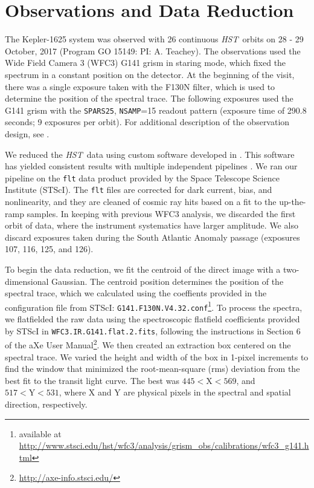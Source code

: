 \documentclass[twocolumn]{aastex62}
\newcommand{\project}[1]{\textsl{#1}}
\newcommand{\HST}{\project{HST}}
\begin{document}


\section{Observations and Data Reduction} \label{sec:data}
The Kepler-1625 system was observed with 26 continuous \HST\ orbits on 28 - 29 October, 2017 (Program GO 15149: PI: A. Teachey). The observations used the Wide Field Camera 3 (WFC3) G141 grism in staring mode, which fixed the spectrum in a constant position on the detector.  At the beginning of the visit, there was a single exposure taken with the F130N filter, which is used to determine the position of the spectral trace. The following exposures used the G141 grism with the \texttt{SPARS25}, \texttt{NSAMP}=15 readout pattern (exposure time of 290.8 seconds; 9 exposures per orbit). For additional description of the observation design, see \cite{teachey18b}.  


We reduced the \HST\ data using custom software developed in \cite{kreidberg14a}.  This software has yielded consistent results with multiple independent pipelines \citep[e.g.][]{knutson14b, spake18}.  We ran our pipeline on the \texttt{flt} data product provided by the Space Telescope Science Institute (STScI). The \texttt{flt} files are corrected for dark current, bias, and nonlinearity, and they are cleaned of cosmic ray hits based on a fit to the up-the-ramp samples. In keeping with previous WFC3 analysis, we discarded the first orbit of data, where the instrument systematics have larger amplitude. We also discard exposures taken during the South Atlantic Anomaly passage (exposures 107, 116, 125, and 126).

To begin the data reduction, we fit the centroid of the direct image with a two-dimensional Gaussian. The centroid position determines the position of the spectral trace, which we calculated using the coeffients provided in the configuration file from STScI: \texttt{G141.F130N.V4.32.conf}\footnote{available at \url{http://www.stsci.edu/hst/wfc3/analysis/grism_obs/calibrations/wfc3_g141.html}}.  To process the spectra, we flatfielded the raw data using the spectroscopic flatfield coefficients provided by STScI in \texttt{WFC3.IR.G141.flat.2.fits}, following the instructions in Section 6 of the aXe User Manual\footnote{\url{http://axe-info.stsci.edu/}}.  We then created an extraction box centered on the spectral trace. We varied the height and width of the box in 1-pixel increments to find the window that minimized the root-mean-square (rms) deviation from the best fit to the transit light curve.  The best was $445  < \mathrm{X} < 569$, and $517 < \mathrm{Y} < 531$, where X and Y are physical pixels in the spectral and spatial direction, respectively. 
\end{document}
